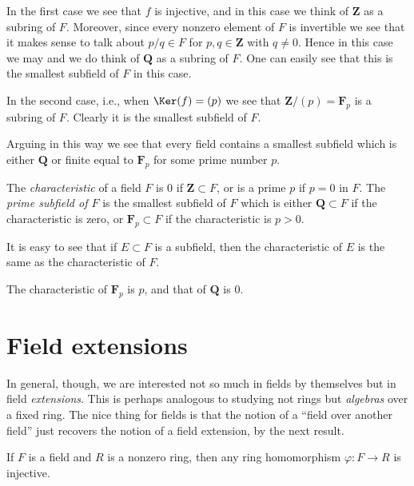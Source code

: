 \medskip\noindent
In the first case we see that $f$ is injective, and in this case
we think of $\mathbf{Z}$ as a subring of $F$. Moreover, since every
nonzero element of $F$ is invertible we see that it makes sense to
talk about $p/q \in F$ for $p, q \in \mathbf{Z}$ with $q \not = 0$.
Hence in this case we may and we do think of $\mathbf{Q}$ as a subring of $F$.
One can easily see that this is the smallest subfield of $F$ in this case.

\medskip\noindent
In the second case, i.e., when $\Ker(f) = (p)$ we see that
$\mathbf{Z}/(p) = \mathbf{F}_p$ is a subring of $F$. Clearly it is the
smallest subfield of $F$.

\medskip\noindent
Arguing in this way we see that every field contains a smallest subfield
which is either $\mathbf{Q}$ or finite equal to $\mathbf{F}_p$ for some
prime number $p$.

\begin{definition}
\label{definition-characteristic}
The {\it characteristic} of a field $F$ is $0$ if
$\mathbf{Z} \subset F$, or is a prime $p$ if $p = 0$ in $F$.
The {\it prime subfield of $F$} is the smallest subfield of $F$
which is either $\mathbf{Q} \subset F$ if the characteristic is zero, or
$\mathbf{F}_p \subset F$ if the characteristic is $p > 0$.
\end{definition}

\noindent
It is easy to see that if $E \subset F$ is a subfield, then the
characteristic of $E$ is the same as the characteristic of $F$.

\begin{example}
\label{example-characteristic}
The characteristic of $\mathbf{F}_p$ is $p$, and that of $\mathbf{Q}$ is $0$.
\end{example}


\section{Field extensions}
\label{section-extensions}

\noindent
In general, though, we are interested not so much in fields by themselves but
in field {\it extensions}. This is perhaps analogous to studying not rings
but {\it algebras} over a fixed ring.
The nice thing for fields is that the notion of a ``field over another field''
just recovers the notion of a field extension, by the next result.

\begin{proposition}
\label{lemma-field-maps-injective}
If $F$ is a field and $R$ is a nonzero ring, then any ring homomorphism
$\varphi : F \to R$ is injective.
\end{proposition}

